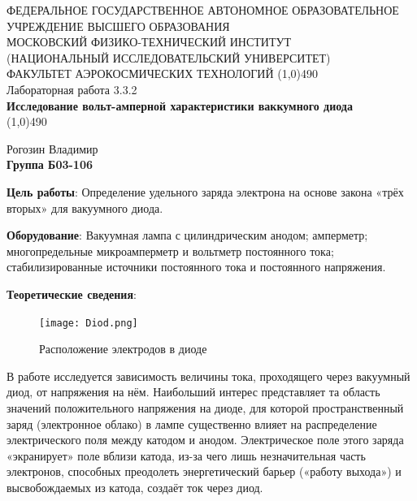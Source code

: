 \documentclass[a4paper,12pt]{article}
\begin{document}
\begin{titlepage}
\begin{center}
\large{\small ФЕДЕРАЛЬНОЕ ГОСУДАРСТВЕННОЕ АВТОНОМНОЕ ОБРАЗОВАТЕЛЬНОЕ\\ УЧРЕЖДЕНИЕ ВЫСШЕГО ОБРАЗОВАНИЯ \\ МОСКОВСКИЙ ФИЗИКО-ТЕХНИЧЕСКИЙ ИНСТИТУТ\\ (НАЦИОНАЛЬНЫЙ ИССЛЕДОВАТЕЛЬСКИЙ УНИВЕРСИТЕТ)\\ ФАКУЛЬТЕТ АЭРОКОСМИЧЕСКИХ ТЕХНОЛОГИЙ}
\vfill
\line(1,0){490}\\[1mm]
\huge{Лабораторная работа 3.3.2}\\
\huge\textbf{Исследование вольт-амперной характеристики ваккумного диода}\\
\line(1,0){490}\\[1mm]
\vfill
\begin{flushright}
\normalsize{Рогозин Владимир}\\
\normalsize{\textbf{Группа Б03-106}}\\
\end{flushright}
\end{center}
\end{titlepage}


\textbf{Цель работы}: Определение удельного заряда электрона на основе закона
«трёх вторых» для вакуумного диода.


\textbf{Оборудование}: Вакуумная лампа с цилиндрическим анодом; амперметр; многопредельные микроамперметр и вольтметр постоянного тока; стабилизированные источники постоянного тока и постоянного напряжения.


\textbf{Теоретические сведения}: 
\begin{figure}\label{fig: diod}
    \begin{center}
    \vspace{-20pt}
        \texttt{[image: Diod.png]}
    \end{center}
    \caption{Расположение электродов в диоде}
\end{figure}
\quad В работе исследуется зависимость величины тока, проходящего через вакуумный диод, от напряжения на нём.  Наибольший интерес представляет та область значений положительного напряжения на диоде, для которой пространственный заряд (электронное облако) в лампе существенно влияет на распределение электрического поля между катодом и анодом. Электрическое поле этого заряда «экранирует» поле вблизи катода, из-за чего лишь незначительная часть электронов, способных преодолеть энергетический барьер («работу выхода») и высвобождаемых из катода, создаёт ток через диод.
\end{document}

